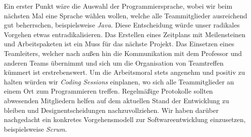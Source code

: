 Ein erster Punkt wäre die Auswahl der Programmiersprache, wobei wir beim nächsten Mal eine Sprache wählen wollen, welche alle Teammitglieder ausreichend gut beherrschen, beispielsweise \emph{Java}. Diese Entscheidung würde unser radikales Vorgehen etwas entradikalisieren. Das Erstellen eines Zeitplans mit Meilensteinen und Arbeitspaketen ist ein Muss für das nächste Projekt.
Das Einsetzen eines Teamleiters, welcher nach außen hin die Kommunikation mit dem Professor und anderen Teams übernimmt und sich um die Organisation von Teamtreffen kümmert ist erstrebenswert. Um die Arbeitsmoral stets angenehm und positiv zu halten würden wir \emph{Coding Sessions} einplanen, wo sich alle Teammitglieder an einem Ort zum Programmieren treffen. Regelmäßige Protokolle sollten abwesenden Mitgliedern helfen auf dem aktuellen Stand der Entwicklung zu bleiben und Designentscheidungen nachzuvollziehen.
Wir haben darüber nachgedacht ein konkretes Vorgehensmodell zur Softwareentwicklung einzusetzen, beispielsweise \emph{Scrum}.